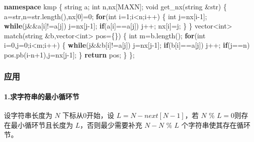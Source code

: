 \documentclass[
]{article}
\newenvironment{Shaded}{}{}
\newcommand{\ControlFlowTok}[1]{\textcolor[rgb]{0.00,0.44,0.13}{\textbf{#1}}}
\newcommand{\DataTypeTok}[1]{\textcolor[rgb]{0.56,0.13,0.00}{#1}}
\newcommand{\DecValTok}[1]{\textcolor[rgb]{0.25,0.63,0.44}{#1}}
\newcommand{\KeywordTok}[1]{\textcolor[rgb]{0.00,0.44,0.13}{\textbf{#1}}}
\newcommand{\NormalTok}[1]{#1}
\begin{document}
\begin{Shaded}
\begin{Highlighting}[]
\KeywordTok{namespace}\NormalTok{ kmp}
\NormalTok{\{}
\NormalTok{    string a;}
    \DataTypeTok{int}\NormalTok{ n,nx[MAXN];}
    \DataTypeTok{void}\NormalTok{ get\_nx(string \&str)}
\NormalTok{    \{}
\NormalTok{        a=str,n=str.length(),nx[}\DecValTok{0}\NormalTok{]=}\DecValTok{0}\NormalTok{;}
        \ControlFlowTok{for}\NormalTok{(}\DataTypeTok{int}\NormalTok{ i=}\DecValTok{1}\NormalTok{;i\textless{}n;i++)}
\NormalTok{        \{}
            \DataTypeTok{int}\NormalTok{ j=nx[i{-}}\DecValTok{1}\NormalTok{];}
            \ControlFlowTok{while}\NormalTok{(j\&\&a[i]!=a[j]) j=nx[j{-}}\DecValTok{1}\NormalTok{];}
            \ControlFlowTok{if}\NormalTok{(a[i]==a[j]) j++;}
\NormalTok{            nx[i]=j;}
\NormalTok{        \}}
\NormalTok{    \}}
\NormalTok{    vector\textless{}}\DataTypeTok{int}\NormalTok{\textgreater{} match(string \&b,vector\textless{}}\DataTypeTok{int}\NormalTok{\textgreater{} pos=\{\})}
\NormalTok{    \{}
        \DataTypeTok{int}\NormalTok{ m=b.length();}
        \ControlFlowTok{for}\NormalTok{(}\DataTypeTok{int}\NormalTok{ i=}\DecValTok{0}\NormalTok{,j=}\DecValTok{0}\NormalTok{;i\textless{}m;i++)}
\NormalTok{        \{}
            \ControlFlowTok{while}\NormalTok{(j\&\&b[i]!=a[j]) j=nx[j{-}}\DecValTok{1}\NormalTok{];}
            \ControlFlowTok{if}\NormalTok{(b[i]==a[j]) j++;}
            \ControlFlowTok{if}\NormalTok{(j==n) pos.pb(i{-}n+}\DecValTok{1}\NormalTok{),j=nx[j{-}}\DecValTok{1}\NormalTok{];}
\NormalTok{        \}}
        \ControlFlowTok{return}\NormalTok{ pos;}
\NormalTok{    \}}
\NormalTok{\};}
\end{Highlighting}
\end{Shaded}

\hypertarget{ux5e94ux7528}{%
\subsubsection{应用}\label{ux5e94ux7528}}

\hypertarget{ux6c42ux5b57ux7b26ux4e32ux7684ux6700ux5c0fux5faaux73afux8282}{%
\paragraph{1.求字符串的最小循环节}\label{ux6c42ux5b57ux7b26ux4e32ux7684ux6700ux5c0fux5faaux73afux8282}}

设字符串长度为 \(N\) 下标从0开始，设 \(L=N-next[N-1]\)，若 \(N\) \%
\(L=0\)则存在最小循环节且长度为 \(L\)，否则最少需要补充 \(N-N\) \% \(L\)
个字符串使其存在循环节。
\end{document}

